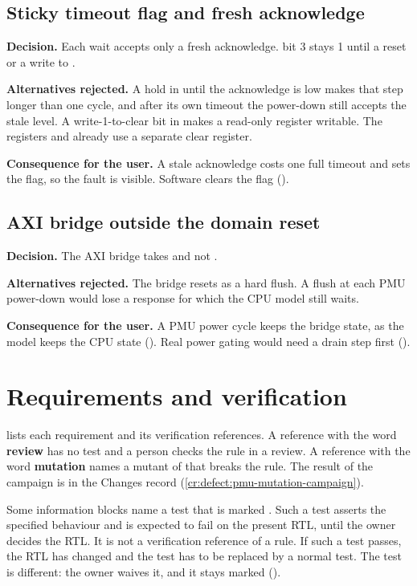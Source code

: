 \subsection{Sticky timeout flag and fresh acknowledge}\label{ds:ch:mod-power-management:dec-flag}
\textbf{Decision.} Each wait accepts only a fresh acknowledge.  bit 3 stays 1 until a reset or a write to .

\textbf{Alternatives rejected.} A hold in  until the acknowledge is low makes that step longer than one cycle, and after its own timeout the power-down still accepts the stale level. A write-1-to-clear bit in  makes a read-only register writable. The registers  and  already use a separate clear register.

\textbf{Consequence for the user.} A stale acknowledge costs one full timeout and sets the flag, so the fault is visible. Software clears the flag ().

\subsection{AXI bridge outside the domain reset}\label{ds:ch:mod-power-management:dec-bridge}
\textbf{Decision.} The AXI bridge  takes  and not .

\textbf{Alternatives rejected.} The bridge resets as a hard flush. A flush at each PMU power-down would lose a response for which the CPU model still waits.

\textbf{Consequence for the user.} A PMU power cycle keeps the bridge state, as the model keeps the CPU state (). Real power gating would need a drain step first ().

\section{Requirements and verification}\label{ds:ch:mod-power-management:map}
 lists each requirement and its verification references. A reference with the word \textbf{review} has no test and a person checks the rule in a review. A reference with the word \textbf{mutation} names a mutant of  that breaks the rule. The result of the campaign is in the Changes record (\cref{cr:defect:pmu-mutation-campaign}).

Some information blocks name a test that is marked . Such a test asserts the specified behaviour and is expected to fail on the present RTL, until the owner decides the RTL. It is not a verification reference of a rule. If such a test passes, the RTL has changed and the test has to be replaced by a normal test. The test  is different: the owner waives it, and it stays marked ().


